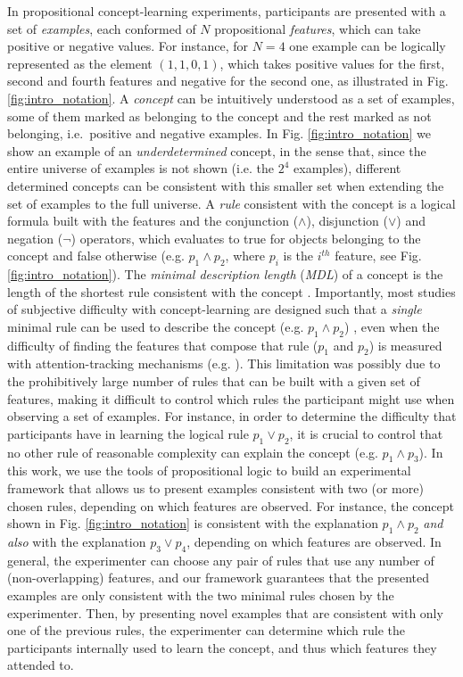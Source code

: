 In propositional concept-learning experiments, participants are presented with a set of \textit{examples}, each conformed of $N$ propositional \textit{features}, which can take positive or negative values. For instance, for $N=4$ one example can be logically represented as the element $(1,1,0,1)$, which takes positive values for the first, second and fourth features and negative for the second one, as illustrated in Fig. \ref{fig:intro_notation}. A \textit{concept} can be intuitively understood as a set of examples, some of them marked as belonging to the concept and the rest marked as not belonging, i.e.\ positive and negative examples. In Fig. \ref{fig:intro_notation} we show an example of an \textit{underdetermined} concept, in the sense that, since the entire universe of examples is not shown (i.e. the $2^4$ examples), different determined concepts can be consistent with this smaller set when extending the set of examples to the full universe. %
A \textit{rule} consistent with the concept is a logical formula built with the features and the conjunction ($\land$), disjunction ($\lor$) and negation ($\lnot$) operators, which evaluates to true for objects belonging to the concept and false otherwise (e.g. $p_1 \land p_2$, where $p_i$ is the $i^{th}$ feature, see Fig. 
\ref{fig:intro_notation}). The \textit{minimal description length} (\textit{MDL}) of a concept is the length of the shortest rule consistent with the concept \cite{grunwald2007minimum}. Importantly, most studies of subjective difficulty with concept-learning are designed such that a {\em single} minimal rule can be used to describe the concept (e.g. $p_1 \land p_2$) \cite{ashby2005human,feldman2000minimization}, even when the difficulty of finding the features that compose that rule ($p_1$ and $p_2$) is measured with attention-tracking mechanisms (e.g. \cite{blair2009extremely,hoffman2010costs}). This limitation was possibly due to the prohibitively large number of rules that can be built with a given set of features, making it difficult to control which rules the participant might use when observing a set of examples. For instance, in order to determine the difficulty that participants have in learning the logical rule $p_1 \lor p_2$, it is crucial to control that no other rule of reasonable complexity can explain the concept (e.g. $p_1 \land p_3$). In this work, we use the tools of propositional logic to build an experimental framework that allows us to present examples consistent with two (or more) chosen rules, depending on which features are observed. For instance, the concept shown in Fig. \ref{fig:intro_notation} is consistent with the explanation $p_1 \land p_2$ \textit{and also} with the explanation $p_3 \lor p_4$, depending on which features are observed. In general, the experimenter can choose any pair of rules that use any number of (non-overlapping) features, and our framework guarantees that the presented examples are only consistent with the two minimal rules chosen by the experimenter. Then, by presenting novel examples that are consistent with only one of the previous rules, the experimenter can determine which rule the participants internally used to learn the concept, and thus which features they attended to.

